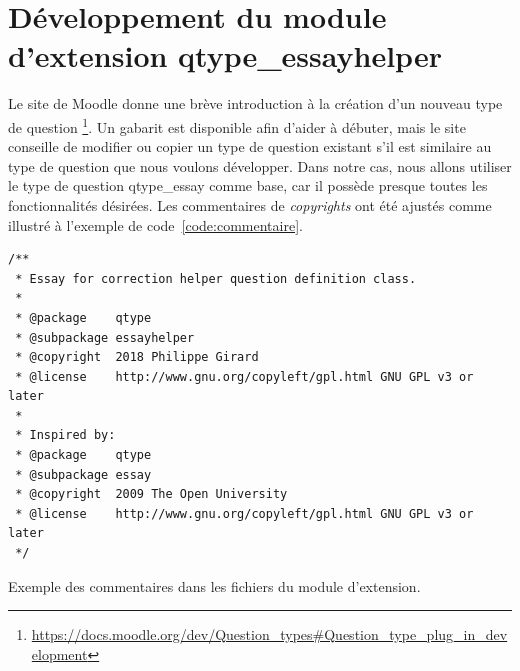﻿\chapter{D\'eveloppement du module d'extension \og qtype\_essayhelper \fg{} }
Le site de Moodle donne une br\`eve introduction \`a la cr\'eation d'un nouveau type de question \footnote{\url{https://docs.moodle.org/dev/Question\_types\#Question\_type\_plug\_in\_development}}.
Un gabarit est disponible afin d'aider \`a d\'ebuter, mais le site conseille de modifier ou copier un type de question existant s'il est similaire au type de question que nous voulons d\'evelopper.
Dans notre cas, nous allons utiliser le type de question \og qtype\_essay \fg{} comme base, car il poss\`ede presque toutes les fonctionnalit\'es d\'esir\'ees.
Les commentaires de \emph{copyrights} ont \'et\'e ajust\'es comme illustr\'e \`a l'exemple de code~\ref{code:commentaire}.
\begin{lstfloat}
\begin{lstlisting}[frame=l]
/**
 * Essay for correction helper question definition class.
 *
 * @package    qtype
 * @subpackage essayhelper
 * @copyright  2018 Philippe Girard
 * @license    http://www.gnu.org/copyleft/gpl.html GNU GPL v3 or later
 *
 * Inspired by:
 * @package    qtype
 * @subpackage essay
 * @copyright  2009 The Open University
 * @license    http://www.gnu.org/copyleft/gpl.html GNU GPL v3 or later
 */
\end{lstlisting}
\caption{Exemple des commentaires dans les fichiers du module d'extension.}
\label{code:commentaire}
\end{lstfloat}
